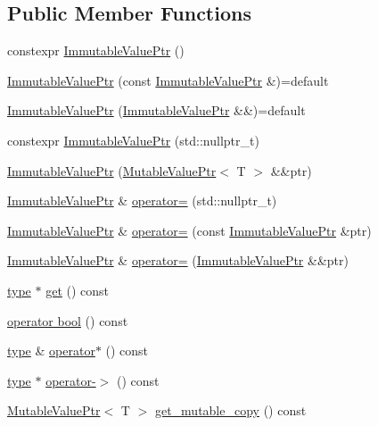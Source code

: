 \subsection*{Public Member Functions}
\begin{DoxyCompactItemize}
\item 
constexpr \hyperlink{classreactor_1_1ImmutableValuePtr_aa7bbdefa52d839dbf71a1b8369754356}{Immutable\+Value\+Ptr} ()
\item 
\hyperlink{classreactor_1_1ImmutableValuePtr_a607b854e71fd1ec5333ae97b15b8fc8d}{Immutable\+Value\+Ptr} (const \hyperlink{classreactor_1_1ImmutableValuePtr}{Immutable\+Value\+Ptr} \&)=default
\item 
\hyperlink{classreactor_1_1ImmutableValuePtr_acd518265a1c01dd99d48254922264f23}{Immutable\+Value\+Ptr} (\hyperlink{classreactor_1_1ImmutableValuePtr}{Immutable\+Value\+Ptr} \&\&)=default
\item 
constexpr \hyperlink{classreactor_1_1ImmutableValuePtr_aec3f1f481dc495293453c32f8654b5bc}{Immutable\+Value\+Ptr} (std\+::nullptr\+\_\+t)
\item 
\hyperlink{classreactor_1_1ImmutableValuePtr_a7b1b937ccd6dd4875c3737ba2780019f}{Immutable\+Value\+Ptr} (\hyperlink{classreactor_1_1MutableValuePtr}{Mutable\+Value\+Ptr}$<$ T $>$ \&\&ptr)
\item 
\hyperlink{classreactor_1_1ImmutableValuePtr}{Immutable\+Value\+Ptr} \& \hyperlink{classreactor_1_1ImmutableValuePtr_a94521923de3774c88536498461c5fd6b}{operator=} (std\+::nullptr\+\_\+t)
\item 
\hyperlink{classreactor_1_1ImmutableValuePtr}{Immutable\+Value\+Ptr} \& \hyperlink{classreactor_1_1ImmutableValuePtr_a0cf1105a09d40db7ceae985f9b329a9f}{operator=} (const \hyperlink{classreactor_1_1ImmutableValuePtr}{Immutable\+Value\+Ptr} \&ptr)
\item 
\hyperlink{classreactor_1_1ImmutableValuePtr}{Immutable\+Value\+Ptr} \& \hyperlink{classreactor_1_1ImmutableValuePtr_adeb3de5c3f0dc27613a4b3915f9747e7}{operator=} (\hyperlink{classreactor_1_1ImmutableValuePtr}{Immutable\+Value\+Ptr} \&\&ptr)
\item 
\hyperlink{classreactor_1_1ImmutableValuePtr_a88dbe82ff9b732b87e054ee37254bdfa}{type} $\ast$ \hyperlink{classreactor_1_1ImmutableValuePtr_a65630b7319b433ce022e660866bc27d1}{get} () const
\item 
\hyperlink{classreactor_1_1ImmutableValuePtr_a214067c64b236305411402aa0f332228}{operator bool} () const
\item 
\hyperlink{classreactor_1_1ImmutableValuePtr_a88dbe82ff9b732b87e054ee37254bdfa}{type} \& \hyperlink{classreactor_1_1ImmutableValuePtr_a1cbbf368f886f35c63604424f9b3b393}{operator$\ast$} () const
\item 
\hyperlink{classreactor_1_1ImmutableValuePtr_a88dbe82ff9b732b87e054ee37254bdfa}{type} $\ast$ \hyperlink{classreactor_1_1ImmutableValuePtr_af547b7a43033f0fbe383665c10335173}{operator-\/$>$} () const
\item 
\hyperlink{classreactor_1_1MutableValuePtr}{Mutable\+Value\+Ptr}$<$ T $>$ \hyperlink{classreactor_1_1ImmutableValuePtr_a642520ceaad885335b2e03e319c59749}{get\+\_\+mutable\+\_\+copy} () const
\end{DoxyCompactItemize}
